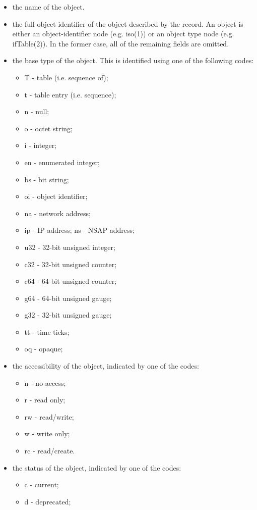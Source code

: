 \begin{itemize}
\item the name of the object.
\item the full object identifier of the object described by the record.
An object is either an object-identifier node (e.g. iso(1)) or an
object type node (e.g. ifTable(2)). In the former case, all of the
remaining fields are omitted.
\item the base type of the object. This is identified using one of the
following codes:
\begin{itemize}
\item T - table (i.e. sequence of);
\item t - table entry (i.e. sequence);
\item n - null;
\item o - octet string;
\item i - integer;
\item en - enumerated integer;
\item bs - bit string;
\item oi - object identifier;
\item na - network address;
\item ip - IP address;
\ite ns - NSAP address;
\item u32 - 32-bit unsigned integer;
\item c32 - 32-bit unsigned counter;
\item c64 - 64-bit unsigned counter;
\item g64 - 64-bit unsigned gauge;
\item g32 - 32-bit unsigned gauge;
\item tt - time ticks;
\item oq - opaque;
\end{itemize}
\item the accessibility of the object, indicated by one of the codes:
\begin{itemize}
\item n - no access;
\item r - read only;
\item rw - read/write;
\item w - write only;
\item rc - read/create.
\end{itemize}
\item the status of the object, indicated by one of the codes:
\begin{itemize}
\item c - current;
\item d - deprecated;

\end{itemize}
\end{itemize}
